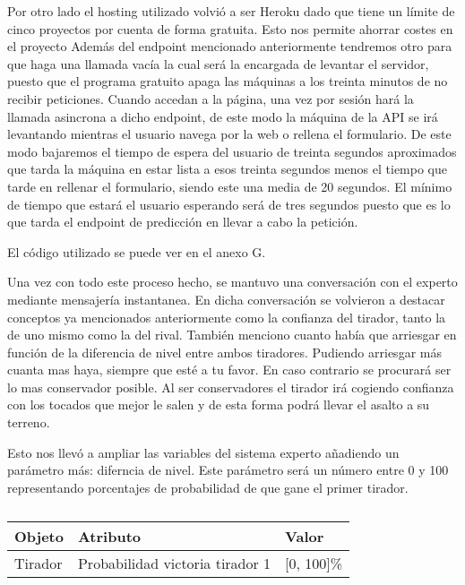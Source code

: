 Por otro lado el hosting utilizado volvió a ser Heroku dado que tiene un límite de cinco
proyectos por cuenta de forma gratuita. Esto nos permite ahorrar costes en el proyecto
Además del endpoint mencionado anteriormente tendremos otro para que haga una llamada vacía
la cual será la encargada de levantar el servidor, puesto que el programa gratuito apaga
las máquinas a los treinta minutos de no recibir peticiones. Cuando accedan a la página, una
vez por sesión hará la llamada asincrona a dicho endpoint, de este modo la máquina de la API
se irá levantando mientras el usuario navega por la web o rellena el formulario. De este modo
bajaremos el tiempo de espera del usuario de treinta segundos aproximados que tarda la máquina en
estar lista a esos treinta segundos menos el tiempo que tarde en rellenar el formulario, siendo
este una media de 20 segundos. El mínimo de tiempo que estará el usuario esperando será de tres
segundos puesto que es lo que tarda el endpoint de predicción en llevar a cabo la petición.

El código utilizado se puede ver en el anexo G.

Una vez con todo este proceso hecho, se mantuvo una conversación con el experto mediante mensajería
instantanea. En dicha conversación se volvieron a destacar conceptos ya mencionados anteriormente
como la confianza del tirador, tanto la de uno mismo como la del rival. También menciono cuanto
había que arriesgar en función de la diferencia de nivel entre ambos tiradores. Pudiendo
arriesgar más cuanta mas haya, siempre que esté a tu favor. En caso contrario se procurará ser
lo mas conservador posible. Al ser conservadores el tirador irá cogiendo confianza con los
tocados que mejor le salen y de esta forma podrá llevar el asalto a su terreno.

Esto nos llevó a ampliar las variables del sistema experto añadiendo un parámetro más: diferncia
de nivel. Este parámetro será un número entre 0 y 100 representando porcentajes de probabilidad
de que gane el primer tirador.

\begin{table}[]
  \centering
  \caption{}
  \label{tab:Tabla objeto atributo y valor}
  \begin{tabular}{lll}
    Objeto & Atributo & Valor \\ \hline
    \multicolumn{1}{l|}{Tirador} & Probabilidad victoria tirador 1 & [0, 100]\%
  \end{tabular}
\end{table}

